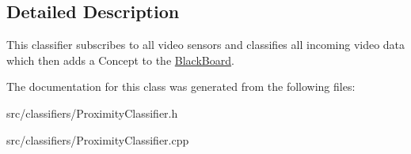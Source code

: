 \subsection{Detailed Description}
This classifier subscribes to all video sensors and classifies all incoming video data which then adds a Concept to the \hyperlink{class_black_board}{Black\+Board}. 

The documentation for this class was generated from the following files\+:\begin{DoxyCompactItemize}
\item 
src/classifiers/Proximity\+Classifier.\+h\item 
src/classifiers/Proximity\+Classifier.\+cpp\end{DoxyCompactItemize}
